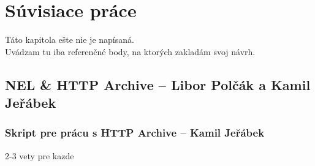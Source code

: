 \chapter{Súvisiace práce}
\label{related-work}

Táto kapitola ešte nie je napísaná.
\\
Uvádzam tu iba referenčné body, na ktorých zakladám svoj návrh.

\section{NEL \& HTTP Archive -- Libor Polčák a Kamil Jeřábek}
\label{praca-veduceho}

\subsection{Skript pre prácu s HTTP Archive -- Kamil Jeřábek}
\label{skript}
2-3 vety pre kazde








